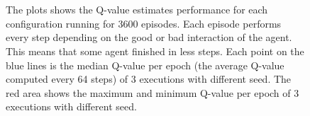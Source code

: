 \begin{figure}[]
	\centering
	 \quad
	 \\
	 \quad
	 \\
	
	\caption{The plots shows the Q-value estimates performance for each configuration running for 3600 episodes. Each episode performs every step depending on the good or bad interaction of the agent. This means that some agent finished in less steps. Each point on the blue lines is the median Q-value per epoch (the average Q-value computed every 64 steps) of 3 executions with different seed. The red area shows the maximum and minimum Q-value per epoch of 3 executions with different seed.}
	\label{fig:q-values}
\end{figure}


